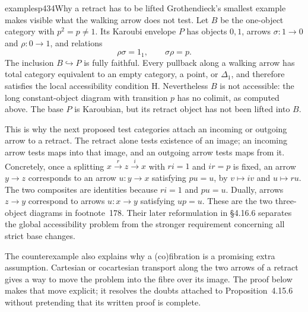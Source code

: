 \begin{dcomment}{examples}{p434}{Why a retract has to be lifted}
Grothendieck's smallest example makes visible what the walking arrow does not test. Let $B$ be the one-object category with $p^2=p\ne1$. Its Karoubi envelope $P$ has objects $0,1$, arrows $\sigma:1\to0$ and $\rho:0\to1$, and relations
\[
 \rho\sigma=1_1,\qquad\sigma\rho=p.
\]
The inclusion $B\hookrightarrow P$ is fully faithful. Every pullback along a walking arrow has total category equivalent to an empty category, a point, or $\Delta_1$, and therefore satisfies the local accessibility condition H. Nevertheless $B$ is not accessible: the long constant-object diagram with transition $p$ has no colimit, as computed above. The base $P$ is Karoubian, but its retract object has not been lifted into $B$.

This is why the next proposed test categories attach an incoming or outgoing arrow to a retract. The retract alone tests existence of an image; an incoming arrow tests maps into that image, and an outgoing arrow tests maps from it. Concretely, once a splitting $x\xrightarrow{r}z\xrightarrow{i}x$ with $ri=1$ and $ir=p$ is fixed, an arrow $y\to z$ corresponds to an arrow $u:y\to x$ satisfying $pu=u$, by $v\mapsto iv$ and $u\mapsto ru$. The two composites are identities because $ri=1$ and $pu=u$. Dually, arrows $z\to y$ correspond to arrows $u:x\to y$ satisfying $up=u$. These are the two three-object diagrams in footnote~178. Their later reformulation in \S4.16.6 separates the global accessibility problem from the stronger requirement concerning all strict base changes.

The counterexample also explains why a (co)fibration is a promising extra assumption. Cartesian or cocartesian transport along the two arrows of a retract gives a way to move the problem into the fibre over its image. The proof below makes that move explicit; it resolves the doubts attached to Proposition~4.15.6 without pretending that its written proof is complete.
\end{dcomment}

